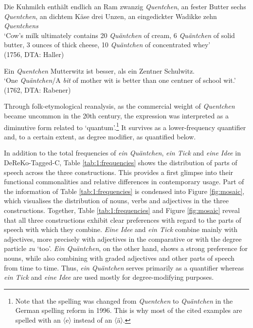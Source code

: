 \documentclass[output=paper]{langsci/langscibook}
\begin{document}
\begin{exe}
	\ex \label{ex:ex10}   Die Kuhmilch enthält endlich an Ram zwanzig \textit{Quentchen}, an 	fester Butter sechs \textit{Quentchen}, an dichtem Käse drei Unzen, an 	eingedickter Wadikke zehn \textit{Quentchens} \\
	‘Cow’s milk ultimately contains 20 \textit{Quäntchen} of cream, 6 	\textit{Quäntchen} of solid butter, 3 ounces of thick cheese, 10 	\textit{Quäntchen} of concentrated whey’ \\ (1756, DTA: Haller) 

	\ex \label{ex:ex11}  Ein \textit{Quentchen} Mutterwitz ist besser, als ein Zentner 	Schulwitz. \\
	‘One \textit{Quäntchen}/A \textit{bit} of mother wit is better than one centner 	of school wit.’ \\
	(1762, DTA: Rabener)
\end{exe}

Through folk-etymological reanalysis, as the commercial weight of \textit{Quentchen} became uncommon in the 20th century, the expression was interpreted as a diminutive form related to ‘quantum’.\footnote{Note that the spelling was changed from \textit{Quentchen} to \textit{Quäntchen} in the German spelling reform in 1996. This is why most of the cited examples are spelled with an 〈e〉 instead of an 〈ä〉.} It survives as a lower-frequency quantifier and, to a certain extent, as degree modifier, as quantified below. 

In addition to the total frequencies of \textit{ein Quäntchen}, \textit{ein Tick} and \textit{eine Idee} in DeReKo-Tagged-C, Table \ref{tab:1:frequencies} shows the distribution of parts of speech across the three constructions. This provides a first glimpse into their functional commonalities and relative differences in contemporary usage. Part of the information of Table \ref{tab:1:frequencies} is condensed into Figure \ref{fig:mosaic}, which visualises the distribution of nouns, verbs and adjectives in the three constructions. Together, Table \ref{tab:1:frequencies} and Figure \ref{fig:mosaic} reveal that all three constructions exhibit clear preferences with regard to the parts of speech with which they combine. \textit{Eine Idee} and \textit{ein Tick} combine mainly with adjectives, more precisely with adjectives in the comparative or with the degree particle \textit{zu} ‘too’. \textit{Ein Quäntchen}, on the other hand, shows a strong preference for nouns, while also combining with graded adjectives and other parts of speech from time to time. Thus, \textit{ein Quäntchen} serves primarily as a quantifier whereas \textit{ein Tick} and \textit{eine Idee} are used mostly for degree-modifying purposes.
\end{document}
